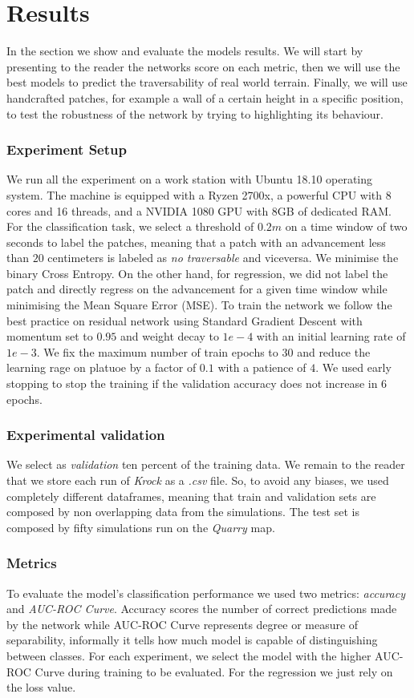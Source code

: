 \documentclass[../document.tex]{subfiles}
\begin{document}
\section{Results}
In the section we show and evaluate the models results. We will start by presenting to the reader the networks score on each metric, then we will use the best models to predict the traversability of real world terrain. Finally, we will use handcrafted patches, for example a wall of a certain height in a specific position, to test the robustness of the network by trying to highlighting its behaviour.
\subsubsection{Experiment Setup}
We run all the experiment on a work station with Ubuntu 18.10 operating system. The machine is equipped with a Ryzen 2700x, a powerful CPU with 8 cores and 16 threads, and a NVIDIA 1080 GPU with 8GB of dedicated RAM.
For the classification task, we select a threshold of $0.2m$ on a time window of two seconds to label the patches, meaning that a patch with an advancement less than $20$ centimeters is labeled as \emph{no traversable} and viceversa. We minimise the binary Cross Entropy.
On the other hand, for regression, we did not label the patch and directly regress on the advancement for a given time window while minimising the Mean Square Error (MSE). 
To train the network we follow the best practice on residual network \cite{he2015deep} using Standard Gradient Descent with momentum set to $0.95$ and weight decay to $1e-4$ with an initial learning rate of $1e-3$.
We fix the maximum number of train epochs to $30$ and reduce the learning rage on platuoe  by a factor of $0.1$ with a patience of $4$. We used early stopping to stop the training if the validation accuracy does not increase in $6$ epochs.
\subsubsection{Experimental validation}
We select as \emph{validation} ten percent of the training data. We remain to the reader that we store each run of \emph{Krock} as a \emph{.csv} file. So, to avoid any biases, we used completely different dataframes, meaning that train and validation sets are composed by non overlapping data from the simulations.
The test set is composed by fifty simulations run on the \emph{Quarry} map. 
\subsubsection{Metrics}
To evaluate the model's classification performance we used two metrics: \emph{accuracy} and \emph{AUC-ROC Curve}. Accuracy scores the number of correct predictions made by the network while AUC-ROC Curve represents degree or measure of separability, informally it tells how much model is capable of distinguishing between classes. For each experiment, we select the model with the higher AUC-ROC Curve during training to be evaluated.
For the regression we just rely on the loss value.
\end{document}
